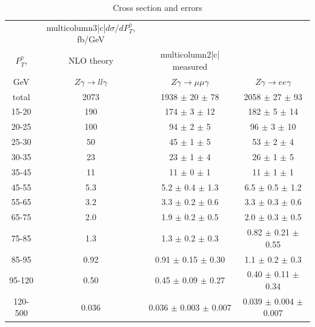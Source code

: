   \begin{table}[h]
  \scriptsize
  \begin{center}
  \caption{Cross section and errors}
  \begin{tabular}{|c|c|c|c|}
                     & multicolumn{3}{|c|}{$d\sigma/dP_{T}^{\gamma}$, fb/GeV} \\ 
     $P_T^{\gamma}$, & NLO theory                          &  multicolumn{2}{|c|}   measured      \\
    GeV              &  $Z\gamma\rightarrow ll\gamma$ & $Z\gamma\rightarrow \mu\mu\gamma$  & $Z\gamma\rightarrow ee\gamma$    \\ \hline
    total & 2073 & 1938 $\pm$ 20 $\pm$ 78 & 2058 $\pm$ 27 $\pm$ 93\\ \hline
    15-20 & 190 & 174 $\pm$ 3 $\pm$ 12 & 182 $\pm$ 5 $\pm$ 14\\ \hline
    20-25 & 100 & 94 $\pm$ 2 $\pm$ 5 & 96 $\pm$ 3 $\pm$ 10\\ \hline
    25-30 & 50 & 45 $\pm$ 1 $\pm$ 5 & 53 $\pm$ 2 $\pm$ 4\\ \hline
    30-35 & 23 & 23 $\pm$ 1 $\pm$ 4 & 26 $\pm$ 1 $\pm$ 5\\ \hline
    35-45 & 11 & 11 $\pm$ 0 $\pm$ 1 & 11 $\pm$ 1 $\pm$ 1\\ \hline
    45-55 & 5.3 & 5.2 $\pm$ 0.4 $\pm$ 1.3 & 6.5 $\pm$ 0.5 $\pm$ 1.2\\ \hline
    55-65 & 3.2 & 3.3 $\pm$ 0.2 $\pm$ 0.6 & 3.3 $\pm$ 0.3 $\pm$ 0.6\\ \hline
    65-75 & 2.0 & 1.9 $\pm$ 0.2 $\pm$ 0.5 & 2.0 $\pm$ 0.3 $\pm$ 0.5\\ \hline
    75-85 & 1.3 & 1.3 $\pm$ 0.2 $\pm$ 0.3  & 0.82 $\pm$ 0.21 $\pm$ 0.55\\ \hline
    85-95 & 0.92 & 0.91 $\pm$ 0.15 $\pm$ 0.30 & 1.1 $\pm$ 0.2 $\pm$ 0.3 \\ \hline
    95-120 & 0.50 & 0.45 $\pm$ 0.09 $\pm$ 0.27 & 0.40 $\pm$ 0.11 $\pm$ 0.34\\ \hline
    120-500 & 0.036 & 0.036 $\pm$ 0.003 $\pm$ 0.007 & 0.039 $\pm$ 0.004 $\pm$ 0.007 \\ \hline
  \end{tabular}
  \label{tab:cs_mc_vs_meas_ZGamma}
  \end{center}
\end{table}
